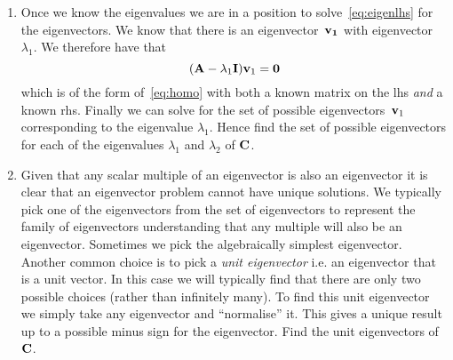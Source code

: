 {\begin{enumerate}
            Hence find the two eigenvalues $\lambda_1$ and $\lambda_2$ of the
            matrix~${\bf C}$ defined earlier.
        \item Once we know the eigenvalues we are in a position to
            solve~\eqref{eq:eigenlhs} for the eigenvectors. We know that there
            is an eigenvector~${\bf v_1}$ with eigenvector~$\lambda_1$. We
            therefore have that
            \[
                ( {\bf A} - \lambda_1 {\bf I} ) {\bf v}_1 = {\bf 0}
            \]
            which is of the form of~\eqref{eq:homo} with both a known matrix
            on the lhs \emph{and} a known rhs. Finally we can solve for the
            set of possible eigenvectors~${\bf v}_1$ corresponding to the
            eigenvalue $\lambda_1$. Hence find the set of possible
            eigenvectors for each of the eigenvalues $\lambda_1$ and
            $\lambda_2$ of ${\bf C}$.
        \item Given that any scalar multiple of an eigenvector is also an
            eigenvector it is clear that an eigenvector problem cannot have
            unique solutions. We typically pick one of the eigenvectors from
            the set of eigenvectors to represent the family of eigenvectors
            understanding that any multiple will also be an eigenvector.
            Sometimes we pick the algebraically simplest eigenvector. Another
            common choice is to pick a \emph{unit eigenvector} i.e. an
            eigenvector that is a unit vector. In this case we will typically
            find that there are only two possible choices (rather than
            infinitely many). To find this unit eigenvector we simply take
            any eigenvector and ``normalise'' it. This gives a unique result
            up to a possible minus sign for the eigenvector. Find the unit
            eigenvectors of ${\bf C}$.
    \end{enumerate}
}

